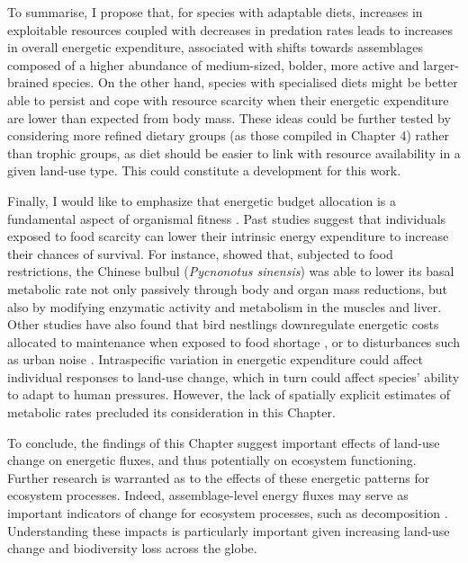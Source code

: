 To summarise, I propose that, for species with adaptable diets, increases in exploitable resources coupled with decreases in predation rates leads to increases in overall energetic expenditure, associated with shifts towards assemblages composed of a higher abundance of medium-sized, bolder, more active and larger- brained species. On the other hand, species with specialised diets might be better able to persist and cope with resource scarcity when their energetic expenditure are lower than expected from body mass. These ideas could be further tested by considering more refined dietary groups (as those compiled in Chapter 4) rather than trophic groups, as diet should be easier to link with resource availability in a given land-use type. This could constitute a development for this work. 

Finally, I would like to emphasize that energetic budget allocation is a fundamental aspect of organismal fitness \citep{RobertBurger2021}. Past studies suggest that individuals exposed to food scarcity can lower their intrinsic energy expenditure to increase their chances of survival. For instance, \citet{Zhang2018a} showed that, subjected to food restrictions, the Chinese bulbul (\textit{Pycnonotus sinensis}) was able to lower its basal metabolic rate not only passively through body and organ mass reductions, but also by modifying enzymatic activity and metabolism in the muscles and liver. Other studies have also found that bird nestlings downregulate energetic costs allocated to maintenance when exposed to food shortage \citep{Brzek2001, Moe2004}, or to disturbances such as urban noise \citep{Brischoux2017}. Intraspecific variation in energetic expenditure could affect individual responses to land-use change, which in turn could affect species’ ability to adapt to human pressures. However, the lack of spatially explicit estimates of metabolic rates precluded its consideration in this Chapter.

To conclude, the findings of this Chapter suggest important effects of land-use change on energetic fluxes, and thus potentially on ecosystem functioning. Further research is warranted as to the effects of these energetic patterns for ecosystem processes. Indeed, assemblage-level energy fluxes may serve as important indicators of change for ecosystem processes, such as decomposition \citep{Barnes2014}. Understanding these impacts is particularly important given increasing land-use change and biodiversity loss across the globe.